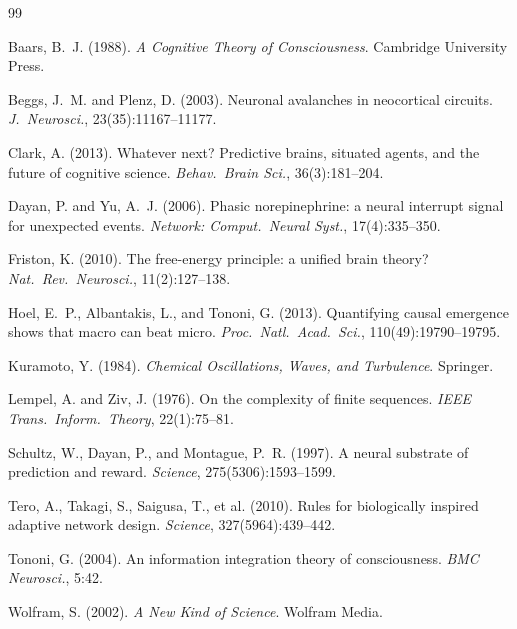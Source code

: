 \documentclass[10pt,letterpaper]{article}
\begin{document}
\begin{thebibliography}{99}

Baars, B.~J. (1988).
\newblock \emph{A Cognitive Theory of Consciousness}.
\newblock Cambridge University Press.

Beggs, J.~M. and Plenz, D. (2003).
\newblock Neuronal avalanches in neocortical circuits.
\newblock \emph{J.\ Neurosci.}, 23(35):11167--11177.

Clark, A. (2013).
\newblock Whatever next? Predictive brains, situated agents, and the
  future of cognitive science.
\newblock \emph{Behav.\ Brain Sci.}, 36(3):181--204.

Dayan, P. and Yu, A.~J. (2006).
\newblock Phasic norepinephrine: a neural interrupt signal for
  unexpected events.
\newblock \emph{Network: Comput.\ Neural Syst.}, 17(4):335--350.

Friston, K. (2010).
\newblock The free-energy principle: a unified brain theory?
\newblock \emph{Nat.\ Rev.\ Neurosci.}, 11(2):127--138.

Hoel, E.~P., Albantakis, L., and Tononi, G. (2013).
\newblock Quantifying causal emergence shows that macro can beat micro.
\newblock \emph{Proc.\ Natl.\ Acad.\ Sci.}, 110(49):19790--19795.

Kuramoto, Y. (1984).
\newblock \emph{Chemical Oscillations, Waves, and Turbulence}.
\newblock Springer.

Lempel, A. and Ziv, J. (1976).
\newblock On the complexity of finite sequences.
\newblock \emph{IEEE Trans.\ Inform.\ Theory}, 22(1):75--81.

Schultz, W., Dayan, P., and Montague, P.~R. (1997).
\newblock A neural substrate of prediction and reward.
\newblock \emph{Science}, 275(5306):1593--1599.

Tero, A., Takagi, S., Saigusa, T., et al. (2010).
\newblock Rules for biologically inspired adaptive network design.
\newblock \emph{Science}, 327(5964):439--442.

Tononi, G. (2004).
\newblock An information integration theory of consciousness.
\newblock \emph{BMC Neurosci.}, 5:42.

Wolfram, S. (2002).
\newblock \emph{A New Kind of Science}.
\newblock Wolfram Media.

\end{thebibliography}
\end{document}
